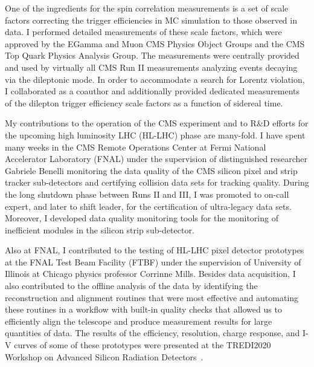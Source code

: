 One of the ingredients for the \ttbar spin correlation measurements is a set of scale factors correcting the trigger efficiencies in MC simulation to those observed in data.
I performed detailed measurements of these scale factors, which were approved by the EGamma and Muon CMS Physics Object Groups and the CMS Top Quark Physics Analysis Group.
The measurements were centrally provided and used by virtually all CMS Run II measurements analyzing \ttbar events decaying via the dileptonic mode.
In order to accommodate a search for Lorentz violation, I collaborated as a coauthor and additionally provided dedicated measurements of the dilepton trigger efficiency scale factors as a function of sidereal time.

My contributions to the operation of the CMS experiment and to R\&D efforts for the upcoming high luminosity LHC (HL-LHC) phase are many-fold.
I have spent many weeks in the CMS Remote Operations Center at Fermi National Accelerator Laboratory (FNAL) under the supervision of distinguished researcher Gabriele Benelli monitoring the data quality of the CMS silicon pixel and strip tracker sub-detectors and certifying collision data sets for tracking quality.
During the long shutdown phase between Runs II and III, I was promoted to on-call expert, and later to shift leader, for the certification of ultra-legacy data sets.
Moreover, I developed data quality monitoring tools for the monitoring of inefficient modules in the silicon strip sub-detector.

Also at FNAL, I contributed to the testing of HL-LHC pixel detector prototypes at the FNAL Test Beam Facility (FTBF) under the supervision of University of Illinois at Chicago physics professor Corrinne Mills.
Besides data acquisition, I also contributed to the offline analysis of the data by identifying the reconstruction and alignment routines that were most effective and automating these routines in a workflow with built-in quality checks that allowed us to efficiently align the telescope and produce measurement results for large quantities of data.
The results of the efficiency, resolution, charge response, and I-V curves of some of these prototypes were presented at the TREDI2020 Workshop on Advanced Silicon Radiation Detectors~\cite{TREDI2020}.

